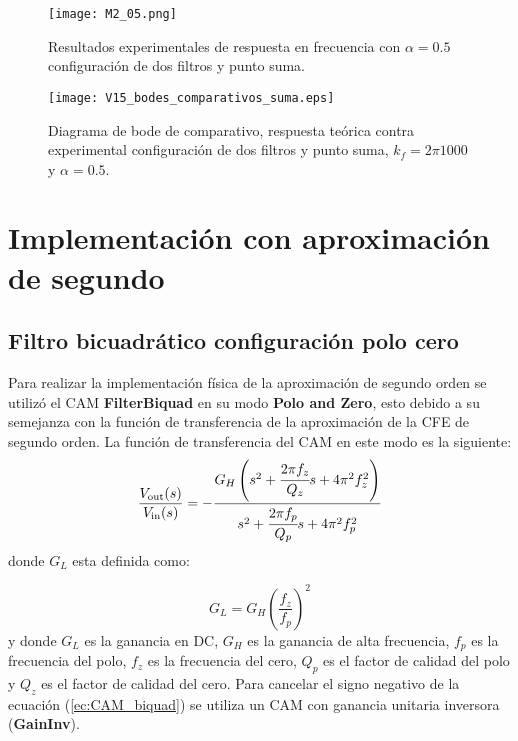 	\begin{figure}[!ht] 
		\caption{Resultados experimentales de respuesta en frecuencia con $\alpha = 0.5$ configuración de dos filtros y punto suma.}
		\label{fig:M2_05}
		\centering
		\texttt{[image: M2\_05.png]}
	\end{figure}	
	
	\begin{figure}[!ht]
		\caption{Diagrama de bode de comparativo, respuesta teórica contra experimental configuración de dos filtros y punto suma,  $k_{f} = 2\pi 1000$ y  $\alpha = 0.5$.} 
		\label{fig:V15_bodes_comparativos_suma}
		\centering
		\texttt{[image: V15\_bodes\_comparativos\_suma.eps]}
	\end{figure}	
	
	\section{Implementación con aproximación de segundo}
	
		\subsection{Filtro bicuadrático configuración polo cero}
	
	Para realizar la implementación física de la aproximación de segundo orden se utilizó el CAM \textbf{FilterBiquad} en su modo \textbf{Polo and Zero}, esto debido a su semejanza con la función de transferencia de la aproximación de la CFE de segundo orden. La función de transferencia del CAM en este modo es la siguiente:
	\begin{equation}
		\frac{V_{\mathrm{out}} (s)}{V_{\mathrm{in}}(s)} = - \frac{G_{H} \left(  s^{2} + \cfrac{2 \pi f_{z}}{Q_{z}} s + 4 \pi^{2} f_{z}^{2} \right)}{s^{2} + \cfrac{2 \pi f_{p}}{Q_{p}}s + 4\pi^{2} f_{p}^{2} }
		\label{ec:CAM_biquad}
	\end{equation}
	donde $G_{L}$  esta definida como:
	
	\begin{equation}
		G_{L} = G_{H} \left( \frac{f_{z}}{f_{p}} \right)^{2}
	\end{equation}
	y donde $G_{L}$ es la ganancia en DC, $G_{H}$ es la ganancia de alta frecuencia, $f_{p}$ es la frecuencia del polo, $f_{z}$ es la frecuencia del cero, $Q_{p}$ es el factor de calidad del polo y $Q_{z}$ es el factor de calidad del cero. Para cancelar el signo negativo de la ecuación (\ref{ec:CAM_biquad}) se utiliza un CAM con ganancia unitaria inversora (\textbf{GainInv}).
	
